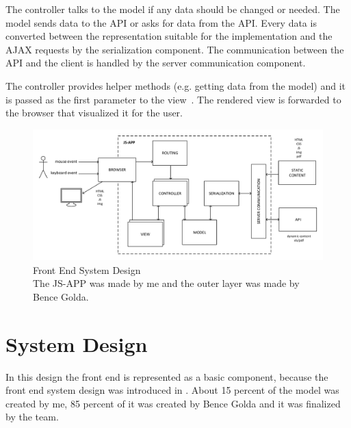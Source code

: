 The controller talks to the model if any data should be changed or needed. The model sends data to the API or asks for data from the API. Every data is converted between the representation suitable for the implementation and the AJAX requests by the serialization component. The communication between the API and the client is handled by the server communication component.

The controller provides helper methods (e.g. getting data from the model) and it is passed as the first parameter to the view~\cite{Mithril-routing}. The rendered view is forwarded to the browser that visualized it for the user.

\newpage
\begin{landscape}
	\begin{figure}[!htbp]
		\centering
		\includegraphics[height=0.8\textwidth]{figures/frontend_rendszerterv.pdf}
		\caption[Front End System Design]{Front End System Design\\The JS-APP was made by me and the outer layer was made by Bence Golda.}
		\label{fig:frontend-system-design}
	\end{figure}
\end{landscape}

\section{System Design}

In this design the front end is represented as a basic component, because the front end system design was introduced in . About 15 percent of the model was created by me, 85 percent of it was created by Bence Golda and it was finalized by the team.

